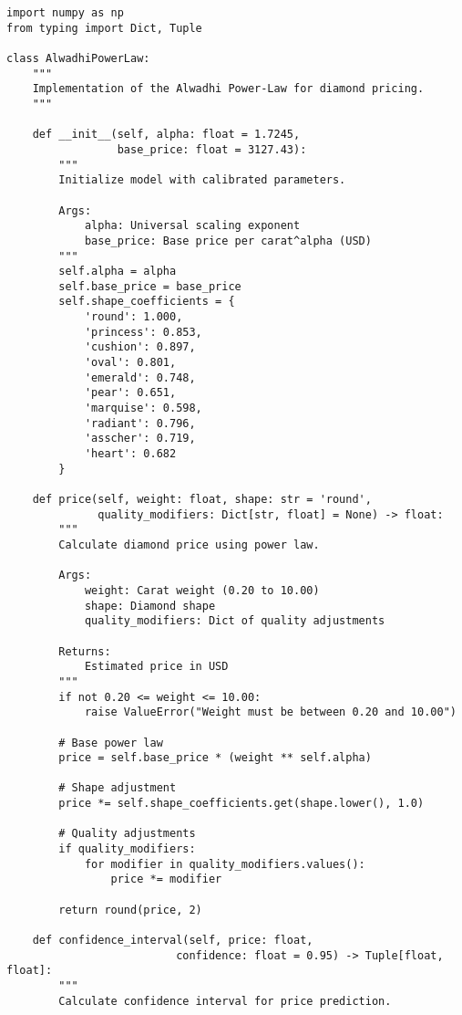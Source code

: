 \documentclass[12pt,a4paper]{article}
\begin{document}
\begin{lstlisting}[caption={Python Implementation of Alwadhi Power-Law},label={lst:implementation}]
import numpy as np
from typing import Dict, Tuple

class AlwadhiPowerLaw:
    """
    Implementation of the Alwadhi Power-Law for diamond pricing.
    """
    
    def __init__(self, alpha: float = 1.7245, 
                 base_price: float = 3127.43):
        """
        Initialize model with calibrated parameters.
        
        Args:
            alpha: Universal scaling exponent
            base_price: Base price per carat^alpha (USD)
        """
        self.alpha = alpha
        self.base_price = base_price
        self.shape_coefficients = {
            'round': 1.000,
            'princess': 0.853,
            'cushion': 0.897,
            'oval': 0.801,
            'emerald': 0.748,
            'pear': 0.651,
            'marquise': 0.598,
            'radiant': 0.796,
            'asscher': 0.719,
            'heart': 0.682
        }
        
    def price(self, weight: float, shape: str = 'round',
              quality_modifiers: Dict[str, float] = None) -> float:
        """
        Calculate diamond price using power law.
        
        Args:
            weight: Carat weight (0.20 to 10.00)
            shape: Diamond shape
            quality_modifiers: Dict of quality adjustments
            
        Returns:
            Estimated price in USD
        """
        if not 0.20 <= weight <= 10.00:
            raise ValueError("Weight must be between 0.20 and 10.00")
            
        # Base power law
        price = self.base_price * (weight ** self.alpha)
        
        # Shape adjustment
        price *= self.shape_coefficients.get(shape.lower(), 1.0)
        
        # Quality adjustments
        if quality_modifiers:
            for modifier in quality_modifiers.values():
                price *= modifier
                
        return round(price, 2)
    
    def confidence_interval(self, price: float, 
                          confidence: float = 0.95) -> Tuple[float, float]:
        """
        Calculate confidence interval for price prediction.
        

\end{lstlisting}
\end{document}
